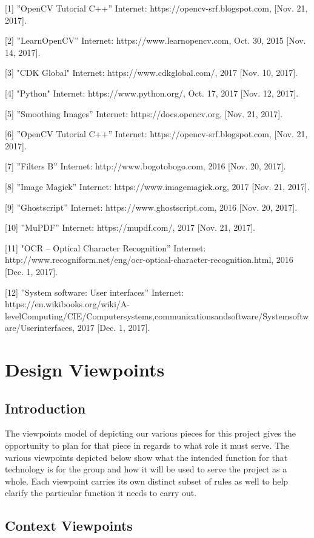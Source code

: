 \documentclass[onecolumn, draftclsnofoot,10pt, compsoc]{IEEEtran}
\begin{document}
[1] ”OpenCV Tutorial C++” Internet: https://opencv-srf.blogspot.com, [Nov. 21, 2017].

[2] ”LearnOpenCV” Internet: https://www.learnopencv.com, Oct. 30, 2015 [Nov. 14, 2017].

[3] "CDK Global" Internet: https://www.cdkglobal.com/, 2017 [Nov. 10, 2017].

[4] "Python" Internet: https://www.python.org/, Oct. 17, 2017 [Nov. 12, 2017].

[5] ”Smoothing Images” Internet: https://docs.opencv.org, [Nov. 21, 2017].

[6] ”OpenCV Tutorial C++” Internet: https://opencv-srf.blogspot.com, [Nov. 21, 2017].

[7] ”Filters B” Internet: http://www.bogotobogo.com, 2016 [Nov. 20, 2017].

[8] ”Image Magick” Internet: https://www.imagemagick.org, 2017 [Nov. 21, 2017].

[9] ”Ghostscript” Internet: https://www.ghostscript.com, 2016 [Nov. 20, 2017].

[10] ”MuPDF” Internet: https://mupdf.com/, 2017 [Nov. 21, 2017].

[11] "OCR – Optical Character Recognition” Internet: http://www.recogniform.net/eng/ocr-optical-character-recognition.html, 2016 [Dec. 1, 2017].

[12] ”System software: User interfaces” Internet: https://en.wikibooks.org/wiki/A-levelComputing/CIE/Computersystems,communicationsandsoftware/Systemsoftware/Userinterfaces, 2017 [Dec. 1, 2017].

\section{Design Viewpoints}
\subsection{Introduction}
The viewpoints model of depicting our various pieces for this project gives the opportunity to plan for that piece in regards to what role it must serve. The various viewpoints depicted below show what the intended function for that technology is for the group and how it will be used to serve the project as a whole. Each viewpoint carries its own distinct subset of rules as well to help clarify the particular function it needs to carry out. 

\subsection{Context Viewpoints}
\end{document}
